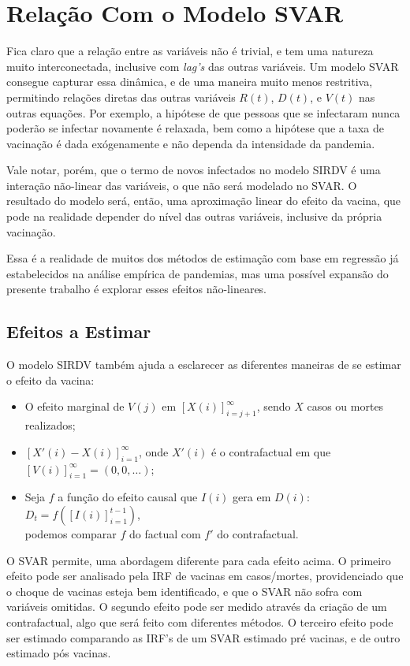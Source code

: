 \documentclass[
    article,
	12pt,				%
	oneside,			%
	a4paper,			%
	english,			%
	brazil,				%
	hyperref = {colorlinks, citecolor=c1d, linkcolor=c2d, urlcolor=c3d, colorlinks}
	]{abntex2}
\newcounter{j}
\begin{document}
\section{Relação Com o Modelo SVAR}\label{sec:teorico2}

Fica claro que a relação entre as variáveis não é trivial, e tem uma natureza muito interconectada, inclusive com \textit{lag's} das outras variáveis. Um modelo SVAR consegue capturar essa dinâmica, e de uma maneira muito menos restritiva, permitindo relações diretas das outras variáveis $R(t)$, $D(t)$, e $V(t)$ nas outras equações. Por exemplo, a hipótese de que pessoas que se infectaram nunca poderão se infectar novamente é relaxada, bem como a hipótese que a taxa de vacinação é dada exógenamente e não dependa da intensidade da pandemia.

Vale notar, porém, que o termo de novos infectados no modelo SIRDV é uma interação não-linear das variáveis, o que não será modelado no SVAR. O resultado do modelo será, então, uma aproximação linear do efeito da vacina, que pode na realidade depender do nível das outras variáveis, inclusive da própria vacinação.

Essa é a realidade de muitos dos métodos de estimação com base em regressão já estabelecidos na análise empírica de pandemias, mas uma possível expansão do presente trabalho é explorar esses efeitos não-lineares.


\subsection{Efeitos a Estimar}

O modelo SIRDV também ajuda a esclarecer as diferentes maneiras de se estimar o efeito da vacina:

\begin{itemize}
    \item O efeito marginal de $V(j)$ em $[X(i)]_{i=j+1}^\infty$, sendo $X$ casos ou mortes realizados;
    \item $[X'(i) - X(i)]_{i=1}^\infty$, onde $X'(i)$ é o contrafactual em que $[V(i)]_{i=1}^\infty = (0, 0, \dots)$;
    \item Seja $f$ a função do efeito causal que $I(i)$ gera em $D(i)$: $D_t = f([I(i)]_{i=1}^{t-1})$,\\ podemos comparar $f$ do factual com $f'$ do contrafactual.
\end{itemize}

O SVAR permite, uma abordagem diferente para cada efeito acima. O primeiro efeito pode ser analisado pela IRF de vacinas em casos/mortes, providenciado que o choque de vacinas esteja bem identificado, e que o SVAR não sofra com variáveis omitidas. O segundo efeito pode ser medido através da criação de um contrafactual, algo que será feito com diferentes métodos. O terceiro efeito pode ser estimado comparando as IRF's de um SVAR estimado pré vacinas, e de outro estimado pós vacinas.
\end{document}
